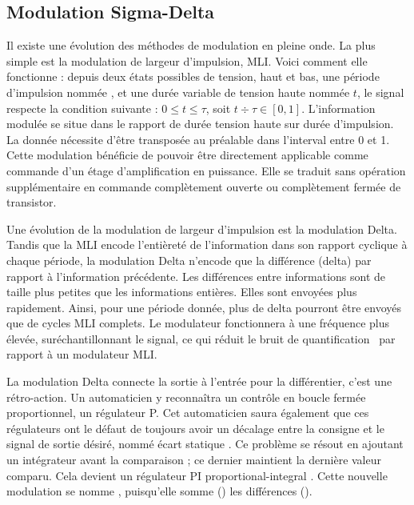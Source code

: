 \documentclass[10pt, oneside, a4paper]{article}
\newcommand{\important}[1]{\textbf{\textsf{\color{gray}{#1}}}}
\begin{document}
\subsection{Modulation Sigma-Delta}
    \label{sec:sigmaDelta}
Il existe une évolution des méthodes de modulation en pleine onde.
La plus simple est la modulation de largeur d'impulsion, MLI.
Voici comment elle fonctionne : depuis deux états possibles de tension, haut et bas, une période d'impulsion nommée \tau, et une durée variable de tension haute nommée $t$, le signal respecte la condition suivante : $0 \leq t \leq \tau $, soit $t \div \tau \in [0,1]$.
L'information modulée se situe dans le rapport de durée tension haute sur durée d'impulsion.
La donnée nécessite d'être transposée au préalable dans l'interval entre 0 et 1.
Cette modulation bénéficie de pouvoir être directement applicable comme commande d'un étage d'amplification en puissance.
Elle se traduit sans opération supplémentaire en commande complètement ouverte ou complètement fermée de transistor.

Une évolution de la modulation de largeur d'impulsion est la modulation Delta.
Tandis que la MLI encode l'entièreté de l'information dans son rapport cyclique à chaque période, la modulation Delta n'encode que la différence (delta) par rapport à l'information précédente.
Les différences entre informations sont de taille plus petites que les informations entières.
Elles sont envoyées plus rapidement.
Ainsi, pour une période donnée, plus de delta pourront être envoyés que de cycles MLI complets.
Le modulateur fonctionnera à une fréquence plus élevée, suréchantillonnant le signal, ce qui réduit le bruit de quantification~\cite{gray1998quantization} par rapport à un modulateur MLI.

La modulation Delta connecte la sortie à l'entrée pour la différentier, c'est une rétro-action.
Un automaticien y reconnaîtra un contrôle en boucle fermée proportionnel, un régulateur P.
Cet automaticien saura également que ces régulateurs ont le défaut de toujours avoir un décalage entre la consigne et le signal de sortie désiré, nommé \og écart statique \fg{}.
Ce problème se résout en ajoutant un intégrateur avant la comparaison ; ce dernier maintient la dernière valeur comparu.
Cela devient un régulateur PI \og proportional-integral \fg{}.
Cette nouvelle modulation se nomme \important{Sigma-Delta}, puisqu'elle somme (\Sigma) les différences (\Delta).
\end{document}
